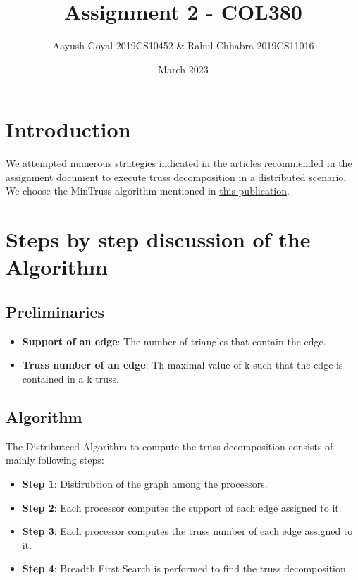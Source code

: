 \documentclass{article}
\title{Assignment 2 - COL380}
\author{Aayush Goyal 2019CS10452 & Rahul Chhabra 2019CS11016}
\date{March 2023}
\begin{document}
\maketitle

\tableofcontents


\section{Introduction}
We attempted numerous strategies indicated in the articles recommended in the assignment document to execute truss decomposition in a distributed scenario. We choose the MinTruss algorithm mentioned in \href{https://link.springer.com/chapter/10.1007/978-3-319-96983-1_50}{this publication}.

\section{Steps by step discussion of the Algorithm}
\subsection{Preliminaries}
\begin{itemize}
    \item \textbf{Support of an edge}: The number of triangles that contain the edge.
    \item \textbf{Truss number of an edge}: Th maximal value of k such that the edge is contained in a k truss.
\end{itemize}

\subsection{Algorithm}

The Distributeed Algorithm to compute the truss decomposition consists of mainly following steps:
\begin{itemize}
    \item \textbf{Step 1}: Distirubtion of the graph among the processors.
    \item \textbf{Step 2}: Each processor computes the support of each edge assigned to it.
    \item \textbf{Step 3}: Each processor computes the truss number of each edge assigned to it.
    \item \textbf{Step 4}: Breadth First Search is performed to find the truss decomposition.
\end{itemize}
\end{document}
